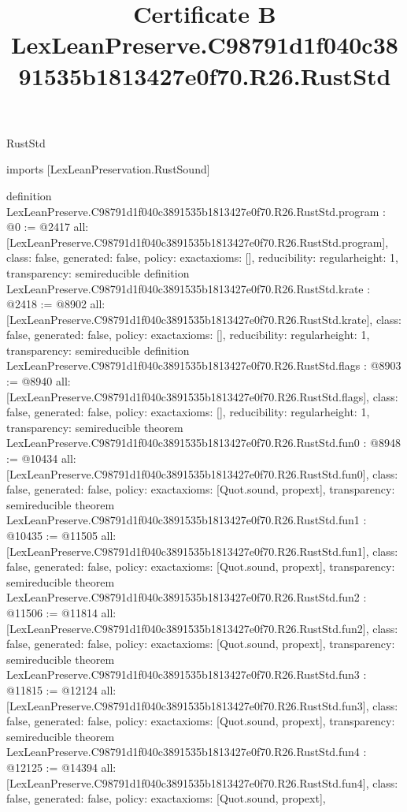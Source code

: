 \begin{lexlean}{RustStd}
\title{Certificate B LexLeanPreserve.C98791d1f040c3891535b1813427e0f70.R26.RustStd}
\begin{coremodule}
imports [LexLeanPreservation.RustSound]

definition LexLeanPreserve.C98791d1f040c3891535b1813427e0f70.R26.RustStd.program : @0 := @2417 {
  all: [LexLeanPreserve.C98791d1f040c3891535b1813427e0f70.R26.RustStd.program],
  class: false,
  generated: false,
  policy: exact{axioms: []},
  reducibility: regular{height: 1},
  transparency: semireducible
}
definition LexLeanPreserve.C98791d1f040c3891535b1813427e0f70.R26.RustStd.krate : @2418 := @8902 {
  all: [LexLeanPreserve.C98791d1f040c3891535b1813427e0f70.R26.RustStd.krate],
  class: false,
  generated: false,
  policy: exact{axioms: []},
  reducibility: regular{height: 1},
  transparency: semireducible
}
definition LexLeanPreserve.C98791d1f040c3891535b1813427e0f70.R26.RustStd.flags : @8903 := @8940 {
  all: [LexLeanPreserve.C98791d1f040c3891535b1813427e0f70.R26.RustStd.flags],
  class: false,
  generated: false,
  policy: exact{axioms: []},
  reducibility: regular{height: 1},
  transparency: semireducible
}
theorem LexLeanPreserve.C98791d1f040c3891535b1813427e0f70.R26.RustStd.fun0 : @8948 := @10434 {
  all: [LexLeanPreserve.C98791d1f040c3891535b1813427e0f70.R26.RustStd.fun0],
  class: false,
  generated: false,
  policy: exact{axioms: [Quot.sound, propext]},
  transparency: semireducible
}
theorem LexLeanPreserve.C98791d1f040c3891535b1813427e0f70.R26.RustStd.fun1 : @10435 := @11505 {
  all: [LexLeanPreserve.C98791d1f040c3891535b1813427e0f70.R26.RustStd.fun1],
  class: false,
  generated: false,
  policy: exact{axioms: [Quot.sound, propext]},
  transparency: semireducible
}
theorem LexLeanPreserve.C98791d1f040c3891535b1813427e0f70.R26.RustStd.fun2 : @11506 := @11814 {
  all: [LexLeanPreserve.C98791d1f040c3891535b1813427e0f70.R26.RustStd.fun2],
  class: false,
  generated: false,
  policy: exact{axioms: [Quot.sound, propext]},
  transparency: semireducible
}
theorem LexLeanPreserve.C98791d1f040c3891535b1813427e0f70.R26.RustStd.fun3 : @11815 := @12124 {
  all: [LexLeanPreserve.C98791d1f040c3891535b1813427e0f70.R26.RustStd.fun3],
  class: false,
  generated: false,
  policy: exact{axioms: [Quot.sound, propext]},
  transparency: semireducible
}
theorem LexLeanPreserve.C98791d1f040c3891535b1813427e0f70.R26.RustStd.fun4 : @12125 := @14394 {
  all: [LexLeanPreserve.C98791d1f040c3891535b1813427e0f70.R26.RustStd.fun4],
  class: false,
  generated: false,
  policy: exact{axioms: [Quot.sound, propext]},
}
\end{coremodule}
\end{lexlean}
